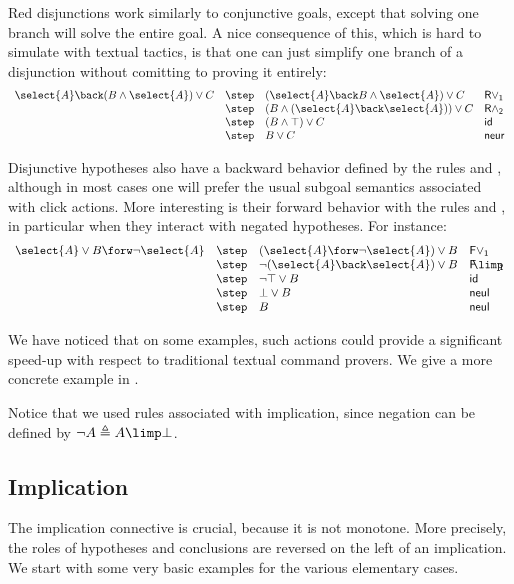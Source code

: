 Red disjunctions work similarly to conjunctive goals, except that solving one
branch will solve the entire goal. A nice consequence of this, which is hard to
simulate with textual tactics, is that one can just simplify one branch of a
disjunction without comitting to proving it entirely:
$$
\begin{array}{llll}
  \select{A} \back (B \land \select{A}) \lor C
    & \step & (\select{A} \back B \land \select{A}) \lor C &\mathsf{R\lor_1}\\
    & \step & (B \land (\select{A} \back \select{A})) \lor C &\mathsf{R\land_2}\\
    & \step & (B \land \top) \lor C &\mathsf{id}\\
    & \step & B \lor C &\mathsf{neur}
\end{array}
$$

Disjunctive hypotheses also have a backward behavior defined by the rules
 and , although in most cases one will prefer the
usual subgoal semantics associated with click actions. More interesting is
their forward behavior with the rules  and , in
particular when they interact with negated hypotheses. For instance:
$$
\begin{array}{llll}
  \select{A} \lor B \forw \neg \select{A}
    & \step & (\select{A} \forw \neg\select{A}) \lor B &\mathsf{F\lor_1}\\
    & \step & \neg (\select{A} \back \select{A}) \lor B &\mathsf{F\!\!\limp\!\!_1}\\
    & \step & \neg \top \lor B &\mathsf{id}\\
    & \step & \bot \lor B &\mathsf{neul}\\
    & \step & B &\mathsf{neul}\\
\end{array}
$$

We have noticed that on some examples, such actions could provide a
significant speed-up with respect to traditional textual command
provers. We give a more concrete example in .

Notice that we used rules associated with implication, since negation can be
defined by $\neg A \triangleq A \limp \bot$.

\subsection{Implication}
The implication connective is crucial, because it is not monotone. More
precisely, the roles of hypotheses and conclusions are reversed on the
left of an implication. We start with some very basic examples
for the various elementary cases.

